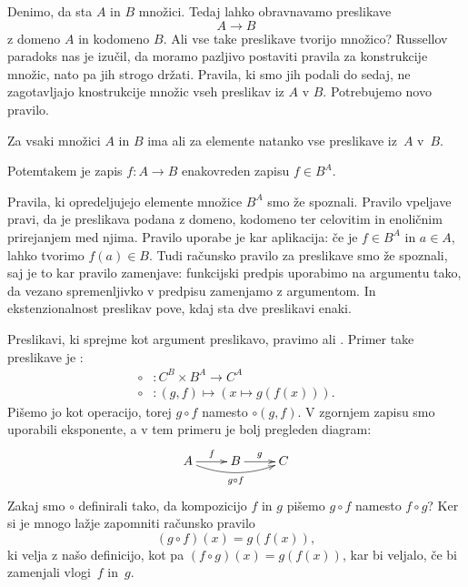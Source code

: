Denimo, da sta $A$ in $B$ množici. Tedaj lahko obravnavamo preslikave
%
\begin{equation*}
  A \to B
\end{equation*}
%
z domeno $A$ in kodomeno $B$. Ali vse take preslikave tvorijo množico? Russellov paradoks
nas je izučil, da moramo pazljivo postaviti pravila za konstrukcije množic, nato pa jih
strogo držati. Pravila, ki smo jih podali do sedaj, ne zagotavljajo knostrukcije množic
vseh preslikav iz $A$ v $B$. Potrebujemo novo pravilo.

\begin{pravilo}[Eksponent]
  Za vsaki množici $A$ in $B$ ima  ali  za
  elemente natanko vse preslikave iz~$A$ v~$B$.
\end{pravilo}

Potemtakem je zapis $f : A \to B$ enakovreden zapisu $f \in B^A$.

Pravila, ki opredeljujejo elemente množice $B^A$ smo že spoznali. Pravilo vpeljave pravi,
da je preslikava podana z domeno, kodomeno ter celovitim in enoličnim prirejanjem med
njima. Pravilo uporabe je kar aplikacija: če je $f \in B^A$ in $a \in A$, lahko tvorimo
$f(a) \in B$. Tudi računsko pravilo za preslikave smo že spoznali, saj je to kar pravilo
zamenjave: funkcijski predpis uporabimo na argumentu tako, da vezano spremenljivko v
predpisu zamenjamo z argumentom. In ekstenzionalnost preslikav pove, kdaj sta dve
preslikavi enaki.

Preslikavi, ki sprejme kot argument preslikavo, pravimo  ali . Primer take preslikave je :
%
\begin{align*}
  {\circ} &: C^B \times B^A \to C^A \\
  {\circ} &: (g, f) \mapsto (x \mapsto g(f(x))).
\end{align*}
%
Pišemo jo kot operacijo, torej $g \circ f$ namesto ${\circ}(g, f)$. V zgornjem zapisu smo
uporabili eksponente, a v tem primeru je bolj pregleden diagram:
%
\begin{equation*}
  \xymatrix{
    {A}
    \ar[r]^{f}
    \ar@/_2ex/[rr]_{g \circ f}
    &
    {B}
    \ar[r]^{g}
    &
    {C}
  }
\end{equation*}
%
Zakaj smo $\circ$ definirali tako, da kompozicijo $f$ in $g$ pišemo $g \circ f$ namesto $f \circ g$? Ker si je mnogo lažje zapomniti računsko pravilo
%
\begin{equation*}
  (g \circ f)(x) = g(f(x)),
\end{equation*}
%
ki velja z našo definicijo, kot pa $(f \circ g)(x) = g(f(x))$, kar bi veljalo, če bi
zamenjali vlogi~$f$ in~$g$.

